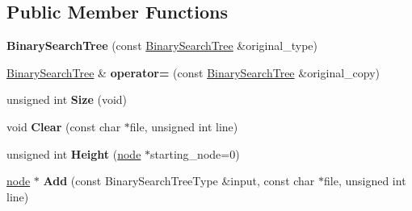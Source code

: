 \subsection*{Public Member Functions}
\begin{DoxyCompactItemize}
\item 
\hypertarget{class_data_structures_1_1_binary_search_tree_a9971027b56966fa5c34075f67dd22bc0}{{\bfseries Binary\-Search\-Tree} (const \hyperlink{class_data_structures_1_1_binary_search_tree}{Binary\-Search\-Tree} \&original\-\_\-type)}\label{class_data_structures_1_1_binary_search_tree_a9971027b56966fa5c34075f67dd22bc0}

\item 
\hypertarget{class_data_structures_1_1_binary_search_tree_ab31d3d1c76535e657e24d687a6ac0f3c}{\hyperlink{class_data_structures_1_1_binary_search_tree}{Binary\-Search\-Tree} \& {\bfseries operator=} (const \hyperlink{class_data_structures_1_1_binary_search_tree}{Binary\-Search\-Tree} \&original\-\_\-copy)}\label{class_data_structures_1_1_binary_search_tree_ab31d3d1c76535e657e24d687a6ac0f3c}

\item 
\hypertarget{class_data_structures_1_1_binary_search_tree_a95931c3bdd7589cc1696b0ad0b5f78ab}{unsigned int {\bfseries Size} (void)}\label{class_data_structures_1_1_binary_search_tree_a95931c3bdd7589cc1696b0ad0b5f78ab}

\item 
\hypertarget{class_data_structures_1_1_binary_search_tree_a2380dab08090b867bb19dbe26bb62dfe}{void {\bfseries Clear} (const char $\ast$file, unsigned int line)}\label{class_data_structures_1_1_binary_search_tree_a2380dab08090b867bb19dbe26bb62dfe}

\item 
\hypertarget{class_data_structures_1_1_binary_search_tree_aaa31a55fe61ec63cf401e0943a9a3361}{unsigned int {\bfseries Height} (\hyperlink{struct_data_structures_1_1_binary_search_tree_1_1node}{node} $\ast$starting\-\_\-node=0)}\label{class_data_structures_1_1_binary_search_tree_aaa31a55fe61ec63cf401e0943a9a3361}

\item 
\hypertarget{class_data_structures_1_1_binary_search_tree_add1e90ecd655a1b28be29813b43f79a8}{\hyperlink{struct_data_structures_1_1_binary_search_tree_1_1node}{node} $\ast$ {\bfseries Add} (const Binary\-Search\-Tree\-Type \&input, const char $\ast$file, unsigned int line)}\label{class_data_structures_1_1_binary_search_tree_add1e90ecd655a1b28be29813b43f79a8}


\end{DoxyCompactItemize}
